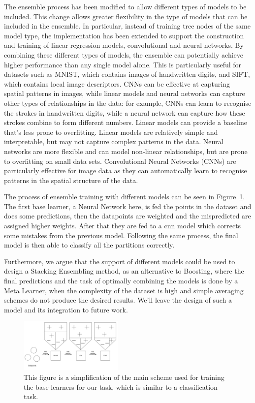 \documentclass[sigconf, nonacm]{acmart}
\begin{document}
The ensemble process has been modified to allow different types of models to be included. This change allows greater flexibility in the type of models that can be included in the ensemble. In particular, instead of training tree nodes of the same model type, the implementation has been extended to support the construction and training of linear regression models, convolutional and neural networks. By combining these different types of models, the ensemble can potentially achieve higher performance than any single model alone. This is particularly useful for datasets such as MNIST, which contains images of handwritten digits, and SIFT, which contains local image descriptors. CNNs can be effective at capturing spatial patterns in images, while linear models and neural networks can capture other types of relationships in the data: for example, CNNs can learn to recognise the strokes in handwritten digits, while a neural network can capture how these strokes combine to form different numbers. Linear models can provide a baseline that's less prone to overfitting. Linear models are relatively simple and interpretable, but may not capture complex patterns in the data. Neural networks are more flexible and can model non-linear relationships, but are prone to overfitting on small data sets. Convolutional Neural Networks (CNNs) are particularly effective for image data as they can automatically learn to recognise patterns in the spatial structure of the data. 

The process of ensemble training with different models can be seen in Figure~\ref{fig:ensemble}. The first base learner, a Neural Network here, is fed the points in the dataset and does some predictions, then the datapoints are weighted and the mispredicted are assigned higher weights. After that they are fed to a cnn model which corrects some mistakes from the previous model. Following the same process, the final model is then able to classify all the partitions correctly.

Furthermore, we argue that the support of different models could be used to design a Stacking Ensembling method, as an alternative to Boosting, where the final predictions and the task of optimally combining the models is done by a Meta Learner, when the complexity of the dataset is high and simple averaging schemes do not produce the desired results. We'll leave the design of such a model and its integration to future work.

\begin{figure}[ht]
\centering
  \includegraphics[width=0.45\textwidth]{plots/ensembling.jpg}
  \caption{ This figure is a simplification of the main scheme used for training the base learners for our task, which is similar to a classification task.} 
  \label{fig:ensemble}
\end{figure}
\end{document}
